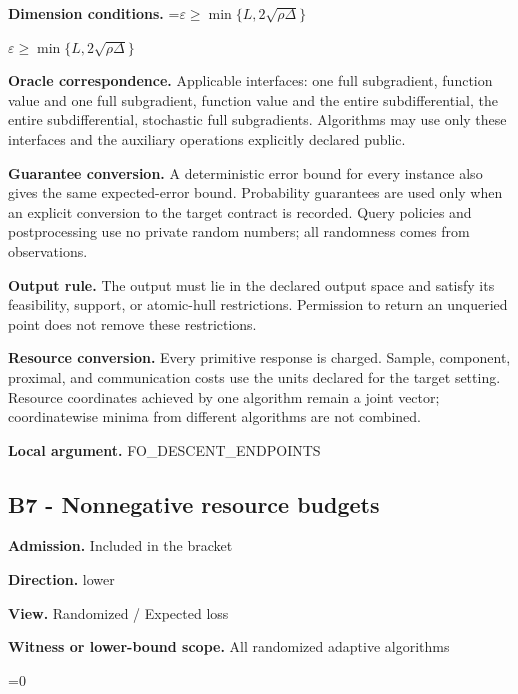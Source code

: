 \documentclass[10pt,a4paper]{article}
\newcommand{\AtlasMath}[1]{\par\begingroup\centering\setbox0=\hbox{$\displaystyle #1$}\ifdim\wd0>1.4\linewidth\typeout{ATLAS WIDE FORMULA: \the\wd0}\fi\ifdim\wd0>\linewidth\resizebox{\linewidth}{!}{\box0}\else\box0\fi\par\endgroup}
\newcommand{\AtlasInlineMath}[1]{\begingroup\setbox0=\hbox{$#1$}\ifdim\wd0>.4\linewidth\endgroup\AtlasMath{#1}\else\endgroup$#1$\fi}
\begin{document}
\textbf{Dimension conditions.} \AtlasInlineMath{\varepsilon\ge\min\{L,2\sqrt{\rho\Delta}\}}



\textbf{Oracle correspondence.} Applicable interfaces: one full subgradient, function value and one full subgradient, function value and the entire subdifferential, the entire subdifferential, stochastic full subgradients. Algorithms may use only these interfaces and the auxiliary operations explicitly declared public.



\textbf{Guarantee conversion.} A deterministic error bound for every instance also gives the same expected-error bound. Probability guarantees are used only when an explicit conversion to the target contract is recorded. Query policies and postprocessing use no private random numbers; all randomness comes from observations.



\textbf{Output rule.} The output must lie in the declared output space and satisfy its feasibility, support, or atomic-hull restrictions. Permission to return an unqueried point does not remove these restrictions.



\textbf{Resource conversion.} Every primitive response is charged. Sample, component, proximal, and communication costs use the units declared for the target setting. Resource coordinates achieved by one algorithm remain a joint vector; coordinatewise minima from different algorithms are not combined.



\textbf{Local argument.} FO\_DESCENT\_ENDPOINTS



\subsection{B7 - Nonnegative resource budgets}


\textbf{Admission.} Included in the bracket



\textbf{Direction.} lower



\textbf{View.} Randomized / Expected loss



\textbf{Witness or lower-bound scope.} All randomized adaptive algorithms



\AtlasMath{0}
\end{document}
